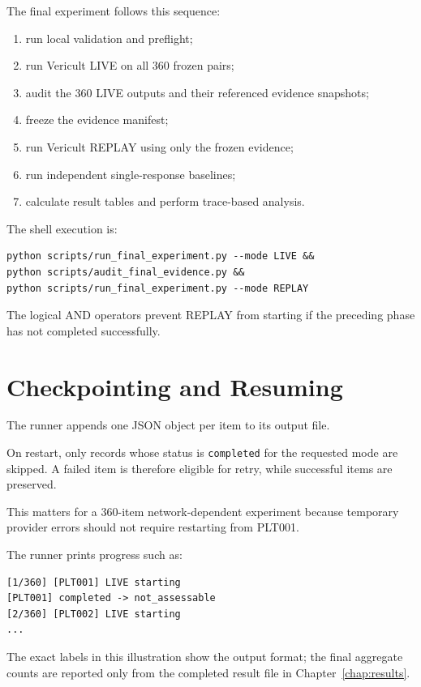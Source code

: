 The final experiment follows this sequence:

\begin{enumerate}
\item run local validation and preflight;
\item run Vericult LIVE on all 360 frozen pairs;
\item audit the 360 LIVE outputs and their referenced evidence snapshots;
\item freeze the evidence manifest;
\item run Vericult REPLAY using only the frozen evidence;
\item run independent single-response baselines;
\item calculate result tables and perform trace-based analysis.
\end{enumerate}

The shell execution is:

\begin{lstlisting}[caption={Final LIVE--audit--REPLAY sequence.}]
python scripts/run_final_experiment.py --mode LIVE &&
python scripts/audit_final_evidence.py &&
python scripts/run_final_experiment.py --mode REPLAY
\end{lstlisting}

The logical AND operators prevent REPLAY from starting if the preceding phase has not completed successfully.

\section{Checkpointing and Resuming}

The runner appends one JSON object per item to its output file.

On restart, only records whose status is \texttt{completed} for the requested mode are skipped. A failed item is therefore eligible for retry, while successful items are preserved.

This matters for a 360-item network-dependent experiment because temporary provider errors should not require restarting from PLT001.

The runner prints progress such as:

\begin{lstlisting}
[1/360] [PLT001] LIVE starting
[PLT001] completed -> not_assessable
[2/360] [PLT002] LIVE starting
...
\end{lstlisting}

The exact labels in this illustration show the output format; the final aggregate counts are reported only from the completed result file in Chapter~\ref{chap:results}.

